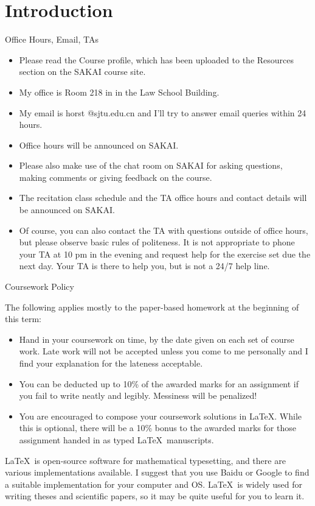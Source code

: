 \documentclass[smaller,hyperref={CJKbookmarks=true}]{beamer}
\begin{document}
\section{Introduction}
\begin{frame}[t,squeeze]{Of{}fice Hours, Email, TAs}
\begin{spacing}{1.2}
\vspace*{-6pt}
\begin{itemize}
  \item Please read the Course profile, which has been uploaded to the
Resources section on the SAKAI course site.
  \item My of{}fice is Room 218 in in the Law School Building.
  \item My email is horst @sjtu.edu.cn and I'll try to answer email queries
within 24 hours.
  \item Of{}fice hours will be announced on SAKAI.
  \item Please also make use of the chat room on SAKAI for asking
questions, making comments or giving feedback on the course.
  \item The recitation class schedule and the TA of{}fice hours and contact
details will be announced on SAKAI.
  \item Of course, you can also contact the TA with questions outside of
of{}fice hours, but please observe basic rules of politeness. It is not
appropriate to phone your TA at 10 pm in the evening and request
help for the exercise set due the next day. Your TA is there to help
you, but is not a 24/7 help line.
\end{itemize}
\end{spacing}
\end{frame}
\begin{frame}[t,squeeze]{Coursework Policy}
\begin{spacing}{1.15}
The following applies mostly to the paper-based homework at the
beginning of this term:
\begin{itemize}
  \item Hand in your coursework on time, by the date given on each set of
course work. Late work will not be accepted unless you come to me
personally and I find your explanation for the lateness acceptable.
  \item You can be deducted up to \textcolor[rgb]{1.00,0.00,0.00}{10\% of the awarded marks for an
assignment} if you fail to write neatly and legibly. Messiness will be
penalized!
  \item You are encouraged to compose your coursework solutions in \LaTeX.
While this is optional, there will be a \textcolor[rgb]{1.00,0.00,0.00}{10\% bonus to the awarded
marks} for those assignment handed in as typed \LaTeX ~manuscripts.
\end{itemize}
\LaTeX ~is open-source software for mathematical typesetting, and there
are various implementations available. I suggest that you use Baidu or
Google to find a suitable implementation for your computer and OS.
\LaTeX ~is widely used for writing theses and scientific papers, so it may
be quite useful for you to learn it.
\end{spacing}
\end{frame}
\end{document}
